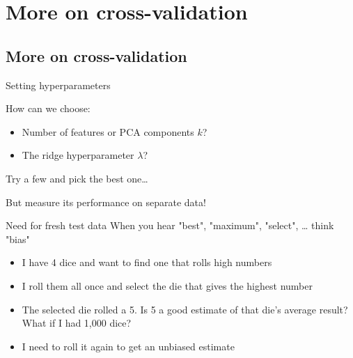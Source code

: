 \documentclass[presentation,mathserif,table]{beamer}
\begin{document}
\section{More on cross-validation}
\label{sec:org348f336}
\subsection{More on cross-validation}
\label{sec:org3f6a510}

\begin{frame}[label={sec:org7ed82c3}]{Setting hyperparameters}
\begin{block}{How can we choose:}
\begin{itemize}
\item Number of features or PCA components \(k\)?
\item The ridge hyperparameter \(\lambda\)?
\end{itemize}
\end{block}
Try a few and pick the best one\ldots{}

But measure its performance on separate data!
\end{frame}
\begin{frame}[label={sec:orgeac8955}]{Need for fresh test data}
When you hear "best", "maximum", "select", \ldots{} think "bias"
\begin{itemize}
\item I have 4 dice and want to find one that rolls high numbers
\item I roll them all once and select the die that gives the highest number
\item The selected die rolled a 5. Is 5 a good estimate of that die's average result? What if I had 1,000 dice?
\item I need to roll it again to get an unbiased estimate
\end{itemize}
\end{frame}
\end{document}

